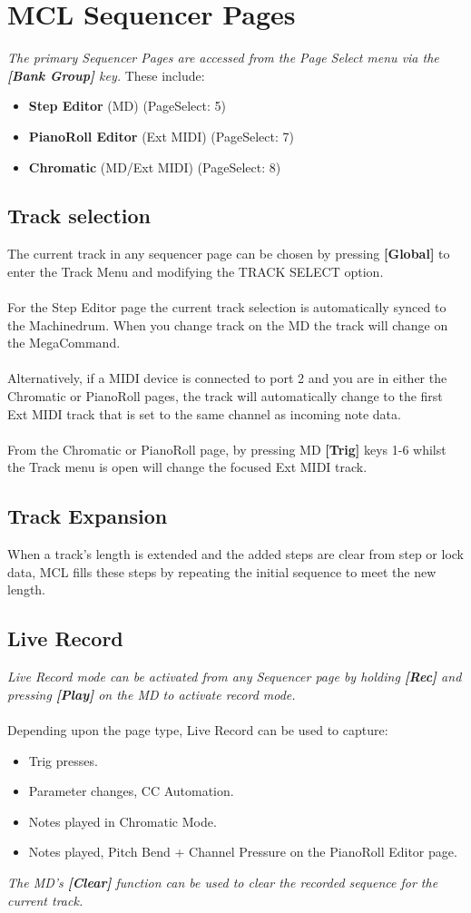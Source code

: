 \chapter{MCL Sequencer Pages}

\textit{The primary Sequencer Pages are accessed from the Page Select menu via the \textbf{[Bank Group]} key.} These include:
\begin{itemize}
    \item \textbf{Step Editor} (MD) (PageSelect: 5)
    \item \textbf{PianoRoll Editor} (Ext MIDI) (PageSelect: 7)
    \item \textbf{Chromatic} (MD/Ext MIDI) (PageSelect: 8)
\end{itemize}
\section{Track selection}
The current track in any sequencer page can be chosen by pressing \textbf{[Global]} to enter the Track Menu and modifying the TRACK SELECT option.
\\\\
For the Step Editor page the current track selection is automatically synced to the Machinedrum. When you change track on the MD the track will change on the MegaCommand.\\\\
Alternatively, if a MIDI device is connected to port 2 and you are in either the Chromatic or PianoRoll pages, the track will automatically change to the first Ext MIDI track that is set to the same channel as incoming note data.\\\\
From the Chromatic or PianoRoll page, by pressing MD \textbf{[Trig]} keys 1-6 whilst the Track menu is open will change the focused Ext MIDI track.
\section{Track Expansion}
When a track's length is extended and the added steps are clear from step or lock data, MCL fills these steps by repeating the initial sequence to meet the new length.
\section{Live Record}
\textit{Live Record mode can be activated from any Sequencer page by holding \textbf{[Rec]} and pressing \textbf{[Play]} on the MD to activate record mode.}\\\\Depending upon the page type, Live Record can be used to capture:
\begin{itemize}
    \item Trig presses.
    \item Parameter changes, CC Automation.
    \item Notes played in Chromatic Mode.
    \item Notes played, Pitch Bend + Channel Pressure on the PianoRoll Editor page.
\end{itemize}
\textit{The MD's \textbf{[Clear]} function can be used to clear the recorded sequence for the current track.}
\newpage
